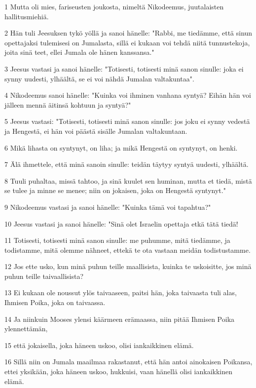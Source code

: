 \par 1 Mutta oli mies, fariseusten joukosta, nimeltä Nikodeemus, juutalaisten hallitusmiehiä.
\par 2 Hän tuli Jeesuksen tykö yöllä ja sanoi hänelle: "Rabbi, me tiedämme, että sinun opettajaksi tulemisesi on Jumalasta, sillä ei kukaan voi tehdä niitä tunnustekoja, joita sinä teet, ellei Jumala ole hänen kanssansa."
\par 3 Jeesus vastasi ja sanoi hänelle: "Totisesti, totisesti minä sanon sinulle: joka ei synny uudesti, ylhäältä, se ei voi nähdä Jumalan valtakuntaa".
\par 4 Nikodeemus sanoi hänelle: "Kuinka voi ihminen vanhana syntyä? Eihän hän voi jälleen mennä äitinsä kohtuun ja syntyä?"
\par 5 Jeesus vastasi: "Totisesti, totisesti minä sanon sinulle: jos joku ei synny vedestä ja Hengestä, ei hän voi päästä sisälle Jumalan valtakuntaan.
\par 6 Mikä lihasta on syntynyt, on liha; ja mikä Hengestä on syntynyt, on henki.
\par 7 Älä ihmettele, että minä sanoin sinulle: teidän täytyy syntyä uudesti, ylhäältä.
\par 8 Tuuli puhaltaa, missä tahtoo, ja sinä kuulet sen huminan, mutta et tiedä, mistä se tulee ja minne se menee; niin on jokaisen, joka on Hengestä syntynyt."
\par 9 Nikodeemus vastasi ja sanoi hänelle: "Kuinka tämä voi tapahtua?"
\par 10 Jeesus vastasi ja sanoi hänelle: "Sinä olet Israelin opettaja etkä tätä tiedä!
\par 11 Totisesti, totisesti minä sanon sinulle: me puhumme, mitä tiedämme, ja todistamme, mitä olemme nähneet, ettekä te ota vastaan meidän todistustamme.
\par 12 Jos ette usko, kun minä puhun teille maallisista, kuinka te uskoisitte, jos minä puhun teille taivaallisista?
\par 13 Ei kukaan ole noussut ylös taivaaseen, paitsi hän, joka taivaasta tuli alas, Ihmisen Poika, joka on taivaassa.
\par 14 Ja niinkuin Mooses ylensi käärmeen erämaassa, niin pitää Ihmisen Poika ylennettämän,
\par 15 että jokaisella, joka häneen uskoo, olisi iankaikkinen elämä.
\par 16 Sillä niin on Jumala maailmaa rakastanut, että hän antoi ainokaisen Poikansa, ettei yksikään, joka häneen uskoo, hukkuisi, vaan hänellä olisi iankaikkinen elämä.
